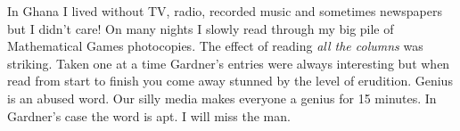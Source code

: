 In Ghana I lived without TV, radio, recorded music and sometimes
newspapers but I didn't care! On many nights I slowly read through my
big pile of Mathematical Games photocopies. The effect of reading
\emph{all the columns} was striking. Taken one at a time Gardner's
entries were always interesting but when read from start to finish you
come away stunned by the level of erudition. Genius is an abused word.
Our silly media makes everyone a genius for 15 minutes. In Gardner's
case the word is apt. I will miss the man.




%